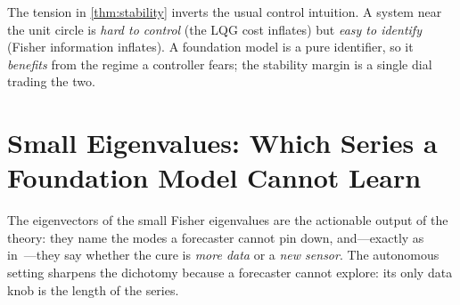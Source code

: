 \documentclass[10pt]{article}
\theoremstyle{plain}
\theoremstyle{definition}
\theoremstyle{remark}
\begin{document}
\begin{remark}
The tension in \cref{thm:stability} inverts the usual control intuition. A system
near the unit circle is \emph{hard to control} (the LQG cost inflates) but
\emph{easy to identify} (Fisher information inflates). A foundation model is a
pure identifier, so it \emph{benefits} from the regime a controller fears; the
stability margin is a single dial trading the two.
\end{remark}

\section{Small Eigenvalues: Which Series a Foundation Model Cannot Learn}
\label{sec:dichotomy}

The eigenvectors of the small Fisher eigenvalues are the actionable output of the
theory: they name the modes a forecaster cannot pin down, and---exactly as
in~\cite[\S11]{wamvla}---they say whether the cure is \emph{more data} or a
\emph{new sensor}. The autonomous setting sharpens the dichotomy because a
forecaster cannot explore: its only data knob is the length of the series.
\end{document}
